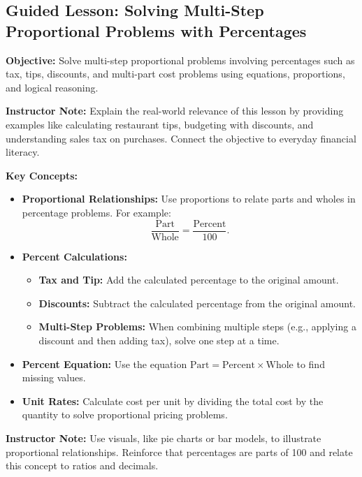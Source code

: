 \documentclass[12pt]{article}
\title{}
\date{}
\begin{document}
\subsection*{Guided Lesson: Solving Multi-Step Proportional Problems with Percentages}
\onehalfspacing

\begin{tcolorbox}[colframe=black!40, colback=gray!5, 
coltitle=black, colbacktitle=black!20, fonttitle=\bfseries\Large, 
title=Learning Objective, halign title=center, left=5pt, right=5pt, top=5pt, bottom=15pt]
\textbf{Objective:} Solve multi-step proportional problems involving percentages such as tax, tips, discounts, and multi-part cost problems using equations, proportions, and logical reasoning.

{\color{blue} \textbf{Instructor Note:} Explain the real-world relevance of this lesson by providing examples like calculating restaurant tips, budgeting with discounts, and understanding sales tax on purchases. Connect the objective to everyday financial literacy.}
\end{tcolorbox}

\vspace{1em}

\begin{tcolorbox}[colframe=black!60, colback=white, 
coltitle=black, colbacktitle=black!15, fonttitle=\bfseries\Large, 
title=Key Concepts and Vocabulary, halign title=center, left=10pt, right=10pt, top=10pt, bottom=15pt]
\textbf{Key Concepts:}
\begin{itemize}
    \item \textbf{Proportional Relationships:} Use proportions to relate parts and wholes in percentage problems. For example:
    \[
    \frac{\text{Part}}{\text{Whole}} = \frac{\text{Percent}}{100}.
    \]
    \item \textbf{Percent Calculations:}
    \begin{itemize}
        \item \textbf{Tax and Tip:} Add the calculated percentage to the original amount.
        \item \textbf{Discounts:} Subtract the calculated percentage from the original amount.
        \item \textbf{Multi-Step Problems:} When combining multiple steps (e.g., applying a discount and then adding tax), solve one step at a time.
    \end{itemize}
    \item \textbf{Percent Equation:} Use the equation \(\text{Part} = \text{Percent} \times \text{Whole}\) to find missing values.
    \item \textbf{Unit Rates:} Calculate cost per unit by dividing the total cost by the quantity to solve proportional pricing problems.
\end{itemize}

{\color{blue} \textbf{Instructor Note:} Use visuals, like pie charts or bar models, to illustrate proportional relationships. Reinforce that percentages are parts of 100 and relate this concept to ratios and decimals.}
\end{tcolorbox}
\end{document}
